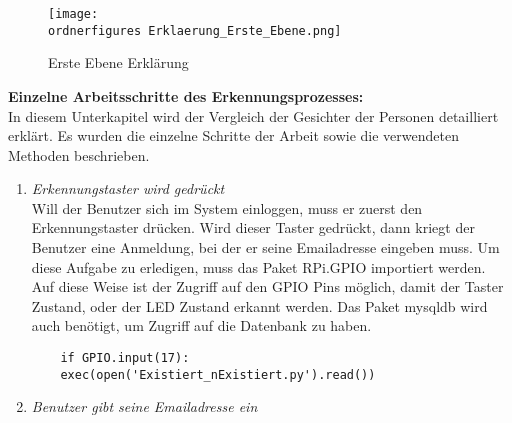 \begin{figure}[H]
	\texttt{[image: \\ordnerfigures Erklaerung\_Erste\_Ebene.png]}
	\caption{Erste Ebene Erklärung}
	\label{fig:Erklaerung_Erste_Ebene}
\end{figure}

\textbf{Einzelne Arbeitsschritte des Erkennungsprozesses: }\\

In diesem Unterkapitel wird der Vergleich der Gesichter der Personen detailliert erklärt. Es wurden die einzelne Schritte der Arbeit sowie die verwendeten Methoden beschrieben.

\begin{enumerate}
	
	\item \textit{Erkennungstaster wird gedr{\"u}ckt} \\
	
	Will der Benutzer sich im System einloggen, muss er zuerst den Erkennungstaster dr{\"u}cken. Wird dieser Taster gedr{\"u}ckt, dann kriegt der Benutzer eine Anmeldung, bei der er seine Emailadresse eingeben muss. Um diese Aufgabe zu erledigen, muss das Paket RPi.GPIO importiert werden. Auf diese Weise ist der Zugriff auf den GPIO Pins m{\"o}glich, damit der Taster Zustand, oder der LED Zustand erkannt werden. Das Paket mysqldb wird auch ben{\"o}tigt, um Zugriff auf die Datenbank zu haben.
	\begin{lstlisting}
	if GPIO.input(17):
	exec(open('Existiert_nExistiert.py').read()) 
	\end{lstlisting} 
	\item \textit{Benutzer gibt seine Emailadresse ein} \\
	

\end{enumerate}
